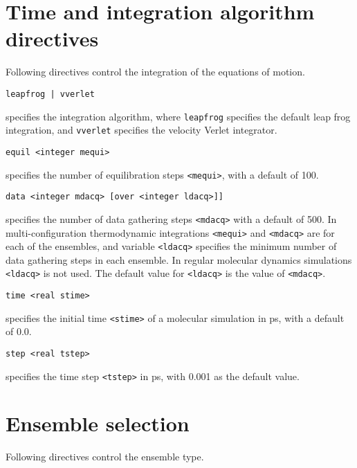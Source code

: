\section{Time and integration algorithm directives}
Following directives control the integration of the equations of motion.
\begin{description}

\item
\begin{verbatim}
leapfrog | vverlet
\end{verbatim}
specifies the integration algorithm,
where {\tt leapfrog} specifies the default leap frog integration, and
{\tt vverlet} specifies the velocity Verlet integrator.

\item
\begin{verbatim}
equil <integer mequi>
\end{verbatim}
specifies the number of equilibration steps \verb+<mequi>+, with a default
of 100.

\item
\begin{verbatim}
data <integer mdacq> [over <integer ldacq>]]
\end{verbatim}
specifies the number of data gathering steps \verb+<mdacq>+ with a
default of 500. In multi-configuration thermodynamic integrations
\verb+<mequi>+ and \verb+<mdacq>+ are for each of the ensembles, and
variable \verb+<ldacq>+ specifies the minimum number of data gathering steps 
in each ensemble. In regular molecular dynamics simulations \verb+<ldacq>+
is not used. The default value for \verb+<ldacq>+ is the value of \verb+<mdacq>+.

\item
\begin{verbatim}
time <real stime>
\end{verbatim}
specifies the initial time \verb+<stime>+ of a molecular simulation in ps,
with a default of 0.0.

\item
\begin{verbatim}
step <real tstep>
\end{verbatim}
specifies the time step \verb+<tstep>+ in ps, with 0.001 as the default value.
\end{description}

\section{Ensemble selection}
Following directives control the ensemble type.

